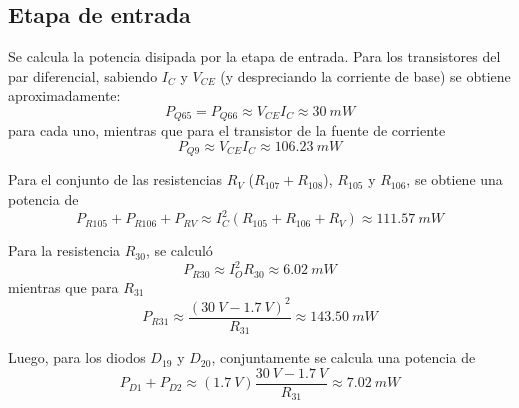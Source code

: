 %
%
%


\subsection{Etapa de entrada}
Se calcula la potencia disipada por la etapa de entrada. Para los transistores del par diferencial, sabiendo $I_C$ y $V_{CE}$ (y despreciando la corriente de base) se obtiene aproximadamente: 
\begin{equation} 
	P_{Q65} = P_{Q66} \approx V_{CE} I_C \approx 30 \ mW
\end{equation}
para cada uno, mientras que para el transistor de la fuente de corriente
\begin{equation} 
	P_{Q9} \approx V_{CE} I_C \approx 106.23 \ mW
\end{equation}

Para el conjunto de las resistencias $R_V$ ($R_{107} + R_108$), $R_{105}$ y $R_{106}$, se obtiene una potencia de
\begin{equation} 
	P_{R105} + P_{R106} + P_{RV} \approx  I_C^2 \left(R_{105} + R_{106} + R_V \right) \approx 111.57 \ mW
\end{equation}

Para la resistencia $R_{30}$, se calculó 
\begin{equation} 
	P_{R30} \approx  I_O^2 R_{30} \approx 6.02 \ mW
\end{equation}
mientras que para $R_{31}$
\begin{equation} 
	P_{R31} \approx  \frac{\left( 30 \ V - 1.7 \ V \right)^2}{R_{31}} \approx 143.50 \ mW
\end{equation}

Luego, para los diodos $D_{19}$ y $D_{20}$, conjuntamente se calcula una potencia de
\begin{equation} 
	P_{D1} + P_{D2} \approx  \left( 1.7 \ V \right) \frac{30 \ V - 1.7 \ V}{R_{31}} \approx 7.02 \ mW
\end{equation}


